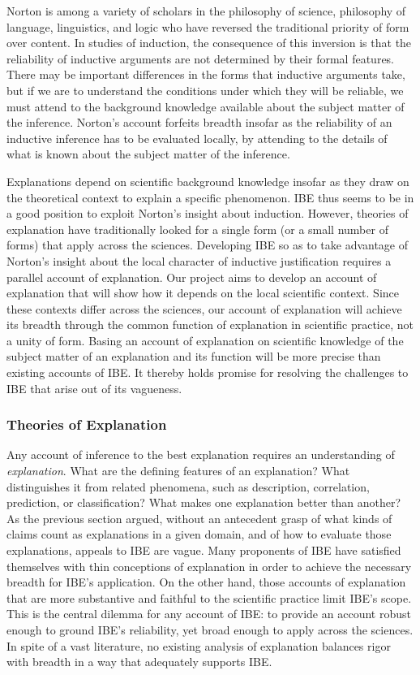 \documentclass{article}[11pt]
\begin{document}
Norton is among a variety of scholars in the philosophy of science, philosophy of language, linguistics, and logic who have reversed the traditional priority of form over content.  In studies of induction, the consequence of this inversion is that the reliability of inductive arguments are not determined by their formal features. There may be important differences in the forms that inductive arguments take, but if we are to understand the conditions under which they will be reliable, we must attend to the background knowledge available about the subject matter of the inference.  Norton's account forfeits breadth insofar as the reliability of an inductive inference has to be evaluated locally, by attending to the details of what is known about the subject matter of the inference.  


Explanations depend on scientific background knowledge insofar as they draw on the theoretical context to explain a specific phenomenon.  IBE thus seems to be in a good position to exploit Norton's insight about induction.  However, theories of explanation have traditionally looked for a single form (or a small number of forms) that apply across the sciences. Developing IBE so as to take advantage of Norton's insight about the local character of inductive justification requires a parallel account of explanation.  Our project aims to develop an account of explanation that will show how it depends on the local scientific context.  Since these contexts differ across the sciences, our account of explanation will achieve its breadth through the common function of explanation in scientific practice,  not a unity of form.  Basing an account of explanation on scientific knowledge of the subject matter of an explanation and its function will be more precise than existing accounts of IBE.  It thereby holds promise for resolving the challenges to IBE that arise out of its vagueness. 


\subsubsection*{Theories of Explanation}

Any account of inference to the best explanation requires an understanding of \textit{explanation}. What are the defining features of an explanation? What distinguishes it from related phenomena, such as description, correlation, prediction, or classification? What makes one explanation better than another? As the previous section argued, without an antecedent grasp of what kinds of claims count as explanations in a given domain, and of how to evaluate those explanations, appeals to IBE are vague.  Many proponents of IBE have satisfied themselves with thin conceptions of explanation in order to achieve the necessary breadth for IBE's application.  On the other hand, those accounts of explanation that are more substantive and faithful to the scientific practice limit IBE's scope.  This is the central dilemma for any account of IBE: to provide an account robust enough to ground IBE's reliability, yet broad enough to apply across the sciences.  In spite of a vast literature, no existing analysis of explanation balances rigor with breadth in a way that adequately supports IBE.  
\end{document}

